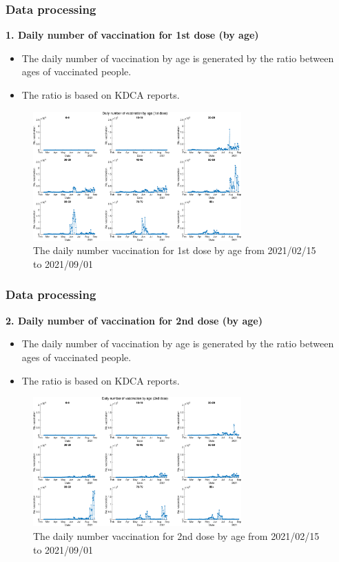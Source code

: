 \documentclass[aspectratio=169, 9pt, xcolor=dvipsnames]{beamer}
\begin{document}
	\begin{frame}\frametitle{Data processing}
	    \textbf{1. Daily number of vaccination for 1st dose (by age)}
	    \begin{itemize}
	    	\item The daily number of vaccination by age is generated by the ratio between ages of vaccinated people.
	    	\item The ratio is based on KDCA reports.
	    \end{itemize}
	    \begin{figure}
	    	\centering
	    	\includegraphics[width=8cm]{../results/data/vaccine_number_by_age_1st.eps}
	    	\caption{The daily number vaccination for 1st dose by age from 2021/02/15 to 2021/09/01}
	    \end{figure}
	\end{frame}

	\begin{frame}\frametitle{Data processing}
	    \textbf{2. Daily number of vaccination for 2nd dose (by age)}
	    \begin{itemize}
	    	\item The daily number of vaccination by age is generated by the ratio between ages of vaccinated people.
	    	\item The ratio is based on KDCA reports.
	    \end{itemize}
	    \begin{figure}
	    	\centering
	    	\includegraphics[width=8cm]{../results/data/vaccine_number_by_age_2nd.eps}
	    	\caption{The daily number vaccination for 2nd dose by age from 2021/02/15 to 2021/09/01}
	    \end{figure}
	\end{frame}
\end{document}
